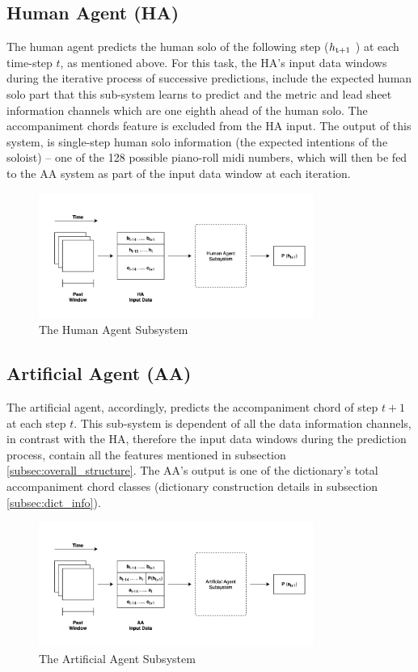         \subsection{Human Agent (HA)}
        The human agent predicts the human solo of the following step ($h\textsubscript{t+1}$ ) at each time-step $t$, as mentioned above. For this task, the HA's input data windows during the iterative process of successive predictions, include the expected human solo part that this sub-system learns to predict and the metric and lead sheet information channels which are one eighth ahead of the human solo. The accompaniment chords feature is excluded from the HA input. The output of this system, is single-step human solo information (the expected intentions of the soloist) -- one of the 128 possible piano-roll midi numbers, which will then be fed to the AA system as part of the input data window at each iteration.

        \begin{figure}[h]
        \centering
        \includegraphics[width=0.8\textwidth]{media/ha_overall.jpg}
        \caption{The Human Agent Subsystem}
        \label{fig:ha_architecture}
        \end{figure}
        
        \subsection{Artificial Agent (AA)}
        The artificial agent, accordingly, predicts the accompaniment chord of step $t+1$ at each step $t$. This sub-system is dependent of all the data information channels, in contrast with the HA, therefore the input data windows during the prediction process, contain all the features mentioned in subsection \ref{subsec:overall_structure}. The AA's output is one of the dictionary's total accompaniment chord classes (dictionary construction details in subsection \ref{subsec:dict_info}).

        \begin{figure}[h]
        \centering
        \includegraphics[width=0.8\textwidth]{media/aa_overall.jpg}
        \caption{The Artificial Agent Subsystem}
        \label{fig:aa_architecture}
        \end{figure}


